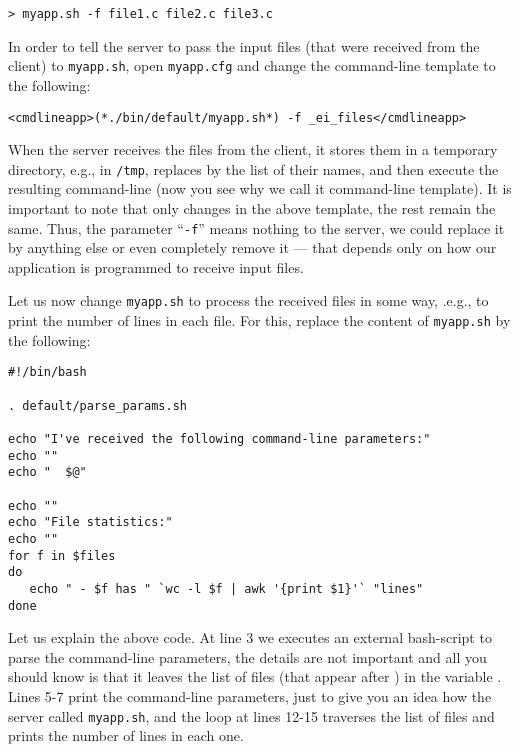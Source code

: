 \medskip
\begin{lstlisting}
> myapp.sh -f file1.c file2.c file3.c
\end{lstlisting}

\medskip 
\noindent
In order to tell the server to pass the input files (that were
received from the client) to \texttt{myapp.sh}, open
\texttt{myapp.cfg} and change the command-line template to the
following:

\medskip
\begin{lstlisting}
<cmdlineapp>(*./bin/default/myapp.sh*) -f _ei_files</cmdlineapp>
\end{lstlisting}

\medskip
\noindent
When the server receives the files from the client, it stores them in
a temporary directory, e.g., in \texttt{/tmp}, replaces 
by the list of their names, and then execute the resulting
command-line (now you see why we call it command-line template).
%
It is important to note that only  changes in the above
template, the rest remain the same. Thus, the parameter
``\texttt{-f}'' means nothing to the server, we could replace it by
anything else or even completely remove it --- that depends only on
how our application is programmed to receive input files.

Let us now change \texttt{myapp.sh} to process the received files in
some way, .e.g., to print the number of lines in each file. For this,
replace the content of \texttt{myapp.sh} by the following:

\medskip
\begin{lstlisting}[style=script]
#!/bin/bash

. default/parse_params.sh

echo "I've received the following command-line parameters:"
echo ""
echo "  $@"

echo ""
echo "File statistics:"
echo ""
for f in $files 
do
   echo " - $f has " `wc -l $f | awk '{print $1}'` "lines"
done
\end{lstlisting}

\medskip
\noindent
Let us explain the above code. 
%
At line 3 we executes an external bash-script to parse the
command-line parameters, the details are not important and all you
should know is that it leaves the list of files (that appear after
) in the variable .
%
Lines 5-7 print the command-line parameters, just to give you an idea
how the server called \texttt{myapp.sh}, and the loop at lines 12-15
traverses the list of files and prints the number of lines in each
one.

